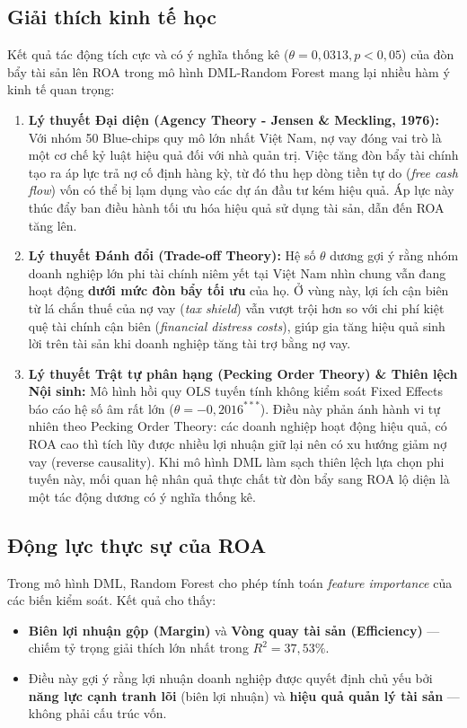 \documentclass[12pt,a4paper]{article}
\begin{document}
\subsection{Giải thích kinh tế học}
Kết quả tác động tích cực và có ý nghĩa thống kê ($\theta = 0,0313, p < 0,05$) của đòn bẩy tài sản lên ROA trong mô hình DML-Random Forest mang lại nhiều hàm ý kinh tế quan trọng:
\begin{enumerate}
    \item \textbf{Lý thuyết Đại diện (Agency Theory - Jensen \& Meckling, 1976):} Với nhóm 50 Blue-chips quy mô lớn nhất Việt Nam, nợ vay đóng vai trò là một cơ chế kỷ luật hiệu quả đối với nhà quản trị. Việc tăng đòn bẩy tài chính tạo ra áp lực trả nợ cố định hàng kỳ, từ đó thu hẹp dòng tiền tự do (\textit{free cash flow}) vốn có thể bị lạm dụng vào các dự án đầu tư kém hiệu quả. Áp lực này thúc đẩy ban điều hành tối ưu hóa hiệu quả sử dụng tài sản, dẫn đến ROA tăng lên.
    \item \textbf{Lý thuyết Đánh đổi (Trade-off Theory):} Hệ số $\theta$ dương gợi ý rằng nhóm doanh nghiệp lớn phi tài chính niêm yết tại Việt Nam nhìn chung vẫn đang hoạt động \textbf{dưới mức đòn bẩy tối ưu} của họ. Ở vùng này, lợi ích cận biên từ lá chắn thuế của nợ vay (\textit{tax shield}) vẫn vượt trội hơn so với chi phí kiệt quệ tài chính cận biên (\textit{financial distress costs}), giúp gia tăng hiệu quả sinh lời trên tài sản khi doanh nghiệp tăng tài trợ bằng nợ vay.
    \item \textbf{Lý thuyết Trật tự phân hạng (Pecking Order Theory) \& Thiên lệch Nội sinh:} Mô hình hồi quy OLS tuyến tính không kiểm soát Fixed Effects báo cáo hệ số âm rất lớn ($\theta = -0,2016^{***}$). Điều này phản ánh hành vi tự nhiên theo Pecking Order Theory: các doanh nghiệp hoạt động hiệu quả, có ROA cao thì tích lũy được nhiều lợi nhuận giữ lại nên có xu hướng giảm nợ vay (reverse causality). Khi mô hình DML làm sạch thiên lệch lựa chọn phi tuyến này, mối quan hệ nhân quả thực chất từ đòn bẩy sang ROA lộ diện là một tác động dương có ý nghĩa thống kê.
\end{enumerate}

\subsection{Động lực thực sự của ROA}
Trong mô hình DML, Random Forest cho phép tính toán \textit{feature importance} của các biến kiểm soát. Kết quả cho thấy:
\begin{itemize}
    \item \textbf{Biên lợi nhuận gộp (Margin)} và \textbf{Vòng quay tài sản (Efficiency)} --- chiếm tỷ trọng giải thích lớn nhất trong $R^2 = 37,53\%$.
    \item Điều này gợi ý rằng lợi nhuận doanh nghiệp được quyết định chủ yếu bởi \textbf{năng lực cạnh tranh lõi} (biên lợi nhuận) và \textbf{hiệu quả quản lý tài sản} --- không phải cấu trúc vốn.
\end{itemize}
\end{document}
